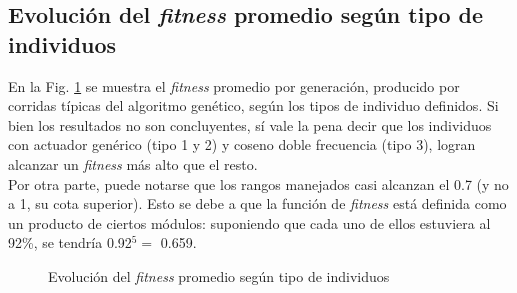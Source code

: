\documentclass{article}
\begin{document}
\subsection{Evoluci\'on del \textit{fitness} promedio seg\'un tipo de individuos}
En la Fig. \ref{fig:resultados_fitness} se muestra el \textit{fitness} promedio por generaci\'on, producido por corridas t\'ipicas del algoritmo gen\'etico, seg\'un los tipos de individuo definidos. Si bien los resultados no son concluyentes, s\'i vale la pena decir que los individuos con actuador gen\'erico (tipo 1 y 2) y coseno doble frecuencia (tipo 3), logran alcanzar un \textit{fitness} m\'as alto que el resto.\\
Por otra parte, puede notarse que los rangos manejados casi alcanzan el 0.7 (y no a 1, su cota superior). Esto se debe a que la funci\'on de \textit{fitness} est\'a definida como un producto de ciertos m\'odulos: suponiendo que cada uno de ellos estuviera al 92\%, se tendr\'ia  0.92$^5 =$ 0.659.
\begin{figure}[H]%
  \centering
  \caption{Evoluci\'on del \textit{fitness} promedio seg\'un tipo de individuos}%
  \label{fig:resultados_fitness} %
\end{figure}
\end{document}

